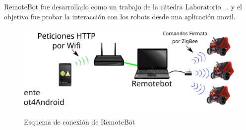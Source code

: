 
RemoteBot fue desarrollado como un trabajo de la cátedra Laboratorio.... y el objetivo fue probar la interacción con los robots desde una aplicación movil.



\begin{figure}
    \centering
    \includegraphics[width=\textwidth]{figures/arquitectura_remotebot}
    \caption{Esquema de conexión de RemoteBot}\label{fig:arquitectura_remotebot}
\end{figure}


